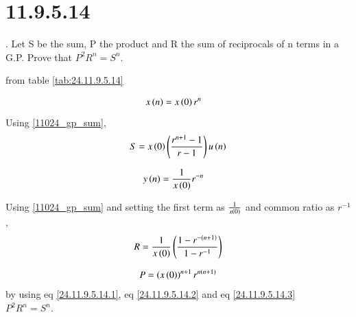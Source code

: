 \documentclass[journal,12pt,twocolumn]{IEEEtran}
\begin{document}


\vspace{3cm}

\title{}
\author{EE23BTECH11024 - G.Karthik Yadav$^{*}$
}
\maketitle
\newpage
\bigskip



\section*{11.9.5.14}
. \hspace{2pt}Let S be the sum, P the product and R the sum of reciprocals of n terms in a G.P.
Prove that $P^2 R^n = S^n$.\\

\solution

from table \ref{tab:24.11.9.5.14}

\begin{align}
    x \left(n\right) & = x\left(0\right)r^{n}  
\end{align}    
Using \eqref{11024_gp_sum},
\begin{align}
    S = x\left(0\right)\left(\frac{r^{n+1}-1}{r-1}\right)u\left(n\right) \label{24.11.9.5.14.1}
\end{align}

\begin{align}
    y\left(n\right) &= \frac{1}{x\left(0\right)} r^{-n}
\end{align}

Using \eqref{11024_gp_sum} and setting the first term as $\frac{1}{x\left(0\right)}$ and common ratio as $r^{-1}$,
\begin{align}
    R = \frac{1}{x\left(0\right)}\left(\frac{1-r^{-\left(n+1\right)}}{1-r^{-1}}\right) \label{24.11.9.5.14.2}
\end{align}

\begin{align}
    P = \left(x\left(0\right)\right)^{n+1} r^{n(n+1)} \label{24.11.9.5.14.3}
\end{align}
by using eq \eqref{24.11.9.5.14.1}, eq \eqref{24.11.9.5.14.2} and eq \eqref{24.11.9.5.14.3} \\
$P^2 R^n = S^n$.
\end{document}
